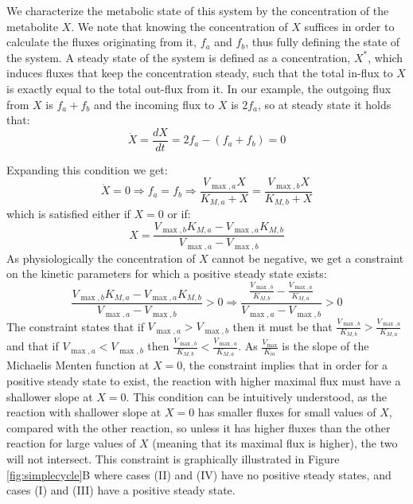 \documentclass[a4page,notitlepage]{article}
\begin{document}
    We characterize the metabolic state of this system by the concentration of the metabolite $X$.
    We note that knowing the concentration of $X$ suffices in order to calculate the fluxes originating from it, $f_a$ and $f_b$, thus fully defining the state of the system.
    A steady state of the system is defined as a concentration, $X^*$, which induces fluxes that keep the concentration steady, such that the total in-flux to $X$ is exactly equal to the total out-flux from it.
    In our example, the outgoing flux from $X$ is $f_a+f_b$ and the incoming flux to $X$ is $2f_a$, so at steady state it holds that:
    \begin{equation}
      \label{eq:xdyna}
      \dot X = \frac{dX}{dt} = 2f_a - (f_a + f_b) = 0
    \end{equation}

    Expanding this condition we get:
    \begin{equation*}
      \dot X = 0 \Rightarrow f_a = f_b \Rightarrow \frac{V_{\max,a}X}{K_{M,a}+X}=\frac{V_{\max,b}X}{K_{M,b}+X}
    \end{equation*}
    which is satisfied either if $X=0$ or if:
    \begin{equation}
      \label{eq:xstst}
      X=\frac{V_{\max,b}K_{M,a}-V_{\max,a}K_{M,b}}{V_{\max,a}-V_{\max,b}}
    \end{equation}
    As physiologically the concentration of $X$ cannot be negative, we get a constraint on the kinetic parameters for which a positive steady state exists:
    \begin{equation*}
      \frac{V_{\max,b}K_{M,a}-V_{\max,a}K_{M,b}}{V_{\max,a}-V_{\max,b}}>0 \Rightarrow \frac{\frac{V_{\max,b}}{K_{M,b}}-\frac{V_{\max,a}}{K_{M,a}}}{V_{\max,a}-V_{\max,b}}>0
    \end{equation*}
    The constraint states that if $V_{\max,a}>V_{\max,b}$ then it must be that $\frac{V_{\max,b}}{K_{M,b}}>\frac{V_{\max,a}}{K_{M,a}}$ and that if $V_{\max,a}<V_{\max,b}$ then $\frac{V_{\max,b}}{K_{M,b}}<\frac{V_{\max,a}}{K_{M,a}}$.
    As $\frac{V_{\max}}{K_m}$ is the slope of the Michaelis Menten function at $X=0$, the constraint implies that in order for a positive steady state to exist, the reaction with higher maximal flux must have a shallower slope at $X=0$.
    This condition can be intuitively understood, as the reaction with shallower slope at $X=0$ has smaller fluxes for small values of $X$, compared with the other reaction, so unless it has higher fluxes than the other reaction for large values of $X$ (meaning that its maximal flux is higher), the two will not intersect.
    This constraint is graphically illustrated in Figure \ref{fig:simplecycle}B where cases (II) and (IV) have no positive steady states, and cases (I) and (III) have a positive steady state.
\end{document}
